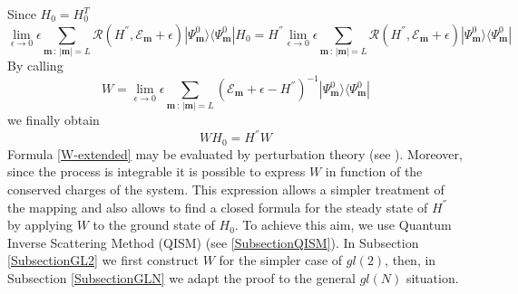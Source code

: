 \documentclass[10pt]{article}
\numberwithin{equation}{section}
\numberwithin{equation}{subsection}
\begin{document}
Since $H_{0}=H_{0}^{T}$ 
\begin{equation}
	\lim_{\epsilon\to 0}\epsilon\sum_{\bm{m}\,:\,|\bm{m}|=L}  \mathcal{R}(H^{''},\mathcal{E}_{\bm{m}}+\epsilon)|\Psi_{\bm{m}}^{0}\rangle \langle \Psi_{\bm{m}}^{0}|H_{0}= H^{''}\lim_{\epsilon\to 0}\epsilon\sum_{\bm{m}\,:\,|\bm{m}|=L}  \mathcal{R}(H^{''},\mathcal{E}_{\bm{m}}+\epsilon)|\Psi_{\bm{m}}^{0}\rangle \langle \Psi_{\bm{m}}^{0}|
\end{equation}
By calling 
\begin{equation}
	W= \lim_{\epsilon\to 0}\epsilon\sum_{\bm{m}\,:\,|\bm{m}|=L}  \left(\mathcal{E}_{\bm{m}}+\epsilon-H^{''}\right)^{-1}|\Psi_{\bm{m}}^{0}\rangle \langle \Psi_{\bm{m}}^{0}|
\end{equation}
we finally obtain 
\begin{equation}
	WH_{0}=H^{''}W
\end{equation}
Formula \eqref{W-extended} may be evaluated by perturbation theory (see \cite{frassek2020duality}). Moreover, since the process is integrable it is possible to express $W$ in function of the conserved charges of the system. This expression allows a simpler treatment of the mapping and also allows to  find a closed formula for the steady state of $H^{''}$ by applying $W$ to the ground state of $H_{0}$. To achieve this aim, we use Quantum Inverse Scattering Method (QISM) (see \ref{SubsectionQISM}). In Subsection \ref{SubsectionGL2} we first construct $W$ for the simpler case of $gl(2)$, then, in Subsection \ref{SubsectionGLN} we adapt the proof to the general $gl(N)$ situation. 
\end{document}
